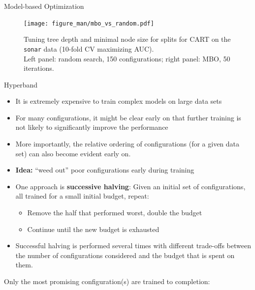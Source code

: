 \begin{vbframe}{Model-based Optimization}
  \begin{center}
\begin{figure}
\texttt{[image: figure\_man/mbo\_vs\_random.pdf]}
\caption{\footnotesize{Tuning tree depth and minimal node size for splits for CART on the \texttt{sonar} data (10-fold CV maximizing AUC). \\
  Left panel: random search, 150 configurations; right panel: MBO, 50 iterations.}}
\end{figure}
\end{center}


\end{vbframe}


\begin{vbframe}{Hyperband}

\begin{itemize}
\item It is extremely expensive to train complex models on large data sets
\item For many configurations, it might be clear early on that further training is not likely to significantly improve the performance
\item More importantly, the relative ordering of configurations (for a given data set) can also become evident early on. 
\item \textbf{Idea:} \enquote{weed out} poor configurations early during training
\item One approach is \textbf{successive halving}: Given an initial set of configurations, all trained for a small initial budget, repeat:
  \begin{itemize}
\item Remove the half that performed worst, double the budget
\item Continue until the new budget is exhausted
\end{itemize}  
\item Successful halving is performed several times with different trade-offs between the number of configurations considered and the budget that is spent on them. 
\end{itemize}

\framebreak 

Only the most promising configuration(s) are trained to completion: 
  

\end{vbframe}
